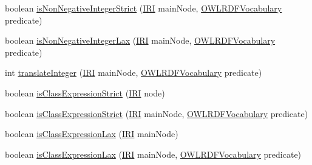 \begin{DoxyCompactItemize}
\item 
boolean \hyperlink{classorg_1_1coode_1_1owlapi_1_1rdfxml_1_1parser_1_1_abstract_class_expression_translator_a637ddaff9db108cb5cccbf034c2e1025}{is\-Non\-Negative\-Integer\-Strict} (\hyperlink{classorg_1_1semanticweb_1_1owlapi_1_1model_1_1_i_r_i}{I\-R\-I} main\-Node, \hyperlink{enumorg_1_1semanticweb_1_1owlapi_1_1vocab_1_1_o_w_l_r_d_f_vocabulary}{O\-W\-L\-R\-D\-F\-Vocabulary} predicate)
\item 
boolean \hyperlink{classorg_1_1coode_1_1owlapi_1_1rdfxml_1_1parser_1_1_abstract_class_expression_translator_a66daa9529959187007cdbd348c3b7a6f}{is\-Non\-Negative\-Integer\-Lax} (\hyperlink{classorg_1_1semanticweb_1_1owlapi_1_1model_1_1_i_r_i}{I\-R\-I} main\-Node, \hyperlink{enumorg_1_1semanticweb_1_1owlapi_1_1vocab_1_1_o_w_l_r_d_f_vocabulary}{O\-W\-L\-R\-D\-F\-Vocabulary} predicate)
\item 
int \hyperlink{classorg_1_1coode_1_1owlapi_1_1rdfxml_1_1parser_1_1_abstract_class_expression_translator_a08b318635d02539d2dc3cadfc5c5acc7}{translate\-Integer} (\hyperlink{classorg_1_1semanticweb_1_1owlapi_1_1model_1_1_i_r_i}{I\-R\-I} main\-Node, \hyperlink{enumorg_1_1semanticweb_1_1owlapi_1_1vocab_1_1_o_w_l_r_d_f_vocabulary}{O\-W\-L\-R\-D\-F\-Vocabulary} predicate)
\item 
boolean \hyperlink{classorg_1_1coode_1_1owlapi_1_1rdfxml_1_1parser_1_1_abstract_class_expression_translator_a03872c3ff21af6dcd2ba63d48509c6a5}{is\-Class\-Expression\-Strict} (\hyperlink{classorg_1_1semanticweb_1_1owlapi_1_1model_1_1_i_r_i}{I\-R\-I} node)
\item 
boolean \hyperlink{classorg_1_1coode_1_1owlapi_1_1rdfxml_1_1parser_1_1_abstract_class_expression_translator_a2dbc97656dcf1365b8213d161c268732}{is\-Class\-Expression\-Strict} (\hyperlink{classorg_1_1semanticweb_1_1owlapi_1_1model_1_1_i_r_i}{I\-R\-I} main\-Node, \hyperlink{enumorg_1_1semanticweb_1_1owlapi_1_1vocab_1_1_o_w_l_r_d_f_vocabulary}{O\-W\-L\-R\-D\-F\-Vocabulary} predicate)
\item 
boolean \hyperlink{classorg_1_1coode_1_1owlapi_1_1rdfxml_1_1parser_1_1_abstract_class_expression_translator_ab5fe6d40630975865849078731c11b6e}{is\-Class\-Expression\-Lax} (\hyperlink{classorg_1_1semanticweb_1_1owlapi_1_1model_1_1_i_r_i}{I\-R\-I} main\-Node)
\item 
boolean \hyperlink{classorg_1_1coode_1_1owlapi_1_1rdfxml_1_1parser_1_1_abstract_class_expression_translator_a0d9b5bebf987ffd47ddc9e3fd89e0ddd}{is\-Class\-Expression\-Lax} (\hyperlink{classorg_1_1semanticweb_1_1owlapi_1_1model_1_1_i_r_i}{I\-R\-I} main\-Node, \hyperlink{enumorg_1_1semanticweb_1_1owlapi_1_1vocab_1_1_o_w_l_r_d_f_vocabulary}{O\-W\-L\-R\-D\-F\-Vocabulary} predicate)

\end{DoxyCompactItemize}
